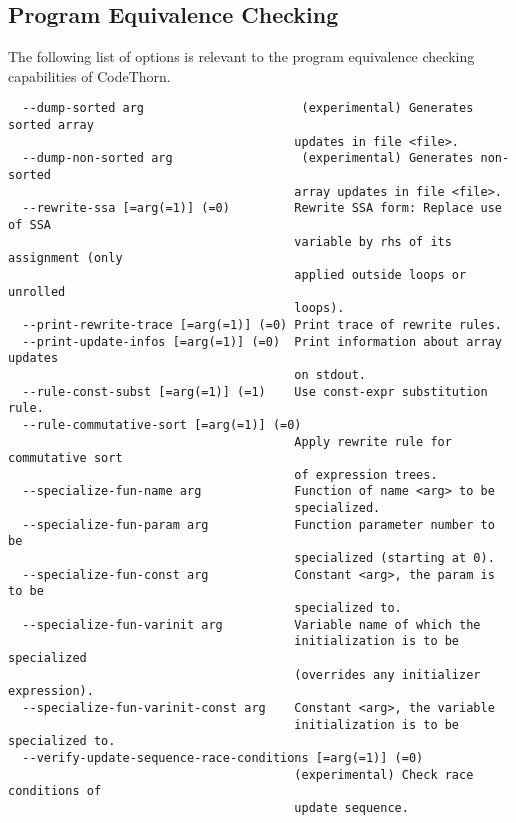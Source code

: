 \documentclass[natbib]{article}
\begin{document}
\subsection{Program Equivalence Checking}
The following list of options is relevant to the program equivalence checking capabilities of CodeThorn.
\begin{verbatim}
  --dump-sorted arg                      (experimental) Generates sorted array 
                                        updates in file <file>.
  --dump-non-sorted arg                  (experimental) Generates non-sorted 
                                        array updates in file <file>.
  --rewrite-ssa [=arg(=1)] (=0)         Rewrite SSA form: Replace use of SSA 
                                        variable by rhs of its assignment (only
                                        applied outside loops or unrolled 
                                        loops).
  --print-rewrite-trace [=arg(=1)] (=0) Print trace of rewrite rules.
  --print-update-infos [=arg(=1)] (=0)  Print information about array updates 
                                        on stdout.
  --rule-const-subst [=arg(=1)] (=1)    Use const-expr substitution rule.
  --rule-commutative-sort [=arg(=1)] (=0)
                                        Apply rewrite rule for commutative sort
                                        of expression trees.
  --specialize-fun-name arg             Function of name <arg> to be 
                                        specialized.
  --specialize-fun-param arg            Function parameter number to be 
                                        specialized (starting at 0).
  --specialize-fun-const arg            Constant <arg>, the param is to be 
                                        specialized to.
  --specialize-fun-varinit arg          Variable name of which the 
                                        initialization is to be specialized 
                                        (overrides any initializer expression).
  --specialize-fun-varinit-const arg    Constant <arg>, the variable 
                                        initialization is to be specialized to.
  --verify-update-sequence-race-conditions [=arg(=1)] (=0)
                                        (experimental) Check race conditions of
                                        update sequence.
\end{verbatim}
\end{document}
